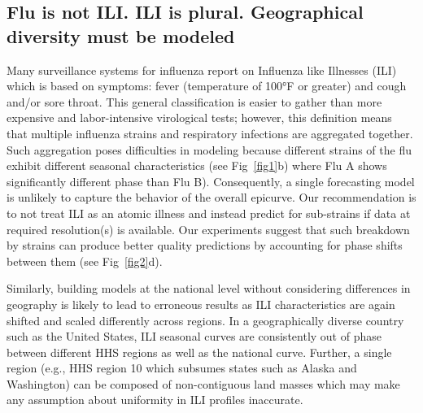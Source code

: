\documentclass[10pt,letterpaper]{article}
\begin{document}
\subsection*{Flu is not ILI. ILI is plural. Geographical diversity must be
modeled}
Many surveillance systems for influenza report on Influenza like Illnesses
(ILI)~\cite{cdc} which is based on symptoms: fever (temperature of 100°F or
greater) and cough and/or sore throat.  This general classification is easier
to gather than more expensive and labor-intensive virological tests; however,
this definition means that multiple influenza strains and respiratory
infections are aggregated together. Such aggregation poses difficulties in
modeling because different strains of the flu exhibit different seasonal
characteristics (see Fig~\ref{fig1}b) where Flu A shows significantly different
phase than Flu B).  Consequently, a single forecasting model is unlikely to
capture the behavior of the overall epicurve. Our recommendation is to not
treat ILI as an atomic illness and instead predict for sub-strains if data at
required resolution(s) is available. Our experiments suggest that such
breakdown by strains can produce better quality predictions by accounting for
phase shifts between them (see Fig~\ref{fig2}d).

Similarly, building models at the national level without
considering differences in geography is likely to lead to erroneous results as
ILI characteristics are again shifted and scaled differently across regions. In
a geographically diverse country such as the United States, ILI seasonal curves
are consistently out of phase between different HHS regions as well as the
national curve. Further, a single region (e.g., HHS region 10 which subsumes
states such as Alaska and Washington) can be composed of non-contiguous land
masses which may make any assumption about uniformity in ILI profiles
inaccurate.
\end{document}
